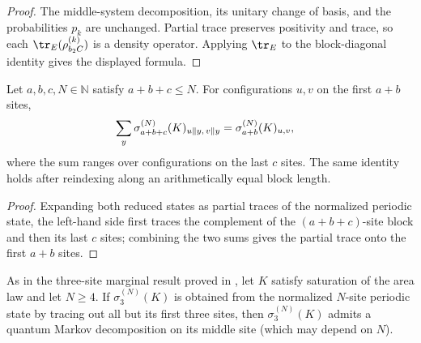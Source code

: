 \begin{proof}
    \leanok
    The middle-system decomposition, its unitary change of basis, and the
    probabilities $p_k$ are unchanged. Partial trace preserves positivity and
    trace, so each $\tr_E(\rho_{b_2 C}^{(k)})$ is a density operator. Applying
    $\tr_E$ to the block-diagonal identity gives the displayed formula.
\end{proof}

\begin{lemma}
    \label{lem:mpdo_reduced_state_collapse_last}
    \leanok
    Let $a,b,c,N\in\mathbb N$ satisfy $a+b+c\leq N$. For configurations
    $u,v$ on the first $a+b$ sites,
    \begin{align}
        \sum_y \sigma_{a+b+c}^{(N)}(K)_
        {u\mathbin\Vert y,\,v\mathbin\Vert y}
         & =\sigma_{a+b}^{(N)}(K)_{u,v},
        \notag
    \end{align}
    where the sum ranges over configurations on the last $c$ sites. The same
    identity holds after reindexing along an arithmetically equal block length.
\end{lemma}

\begin{proof}
    \leanok
    Expanding both reduced states as partial traces of the normalized periodic
    state, the left-hand side first traces the complement of the
    $(a+b+c)$-site block and then its last $c$ sites; combining the two sums
    gives the partial trace onto the first $a+b$ sites.
\end{proof}

\begin{lemma}
    \label{thm:mpdo_sal_three_site_eta_structure}
    \leanok
    As in the three-site marginal result proved in
    \cite[Appendix~C.2, lines~1351--1371]{Cirac2016MPDO_arXiv}, let $K$ satisfy
    saturation of the area law and let $N\geq4$. If $\sigma_3^{(N)}(K)$ is
    obtained from the normalized $N$-site periodic state by tracing out all but
    its first three sites, then $\sigma_3^{(N)}(K)$ admits a quantum Markov
    decomposition on its middle site (which may depend on $N$).
\end{lemma}

